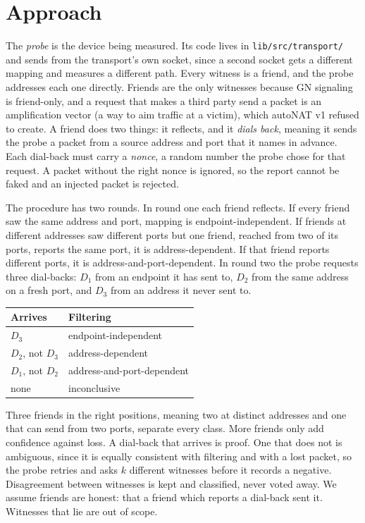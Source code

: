 \documentclass[11pt]{article}
\newcommand{\code}[1]{\texttt{\small #1}}
\begin{document}
\section{Approach}

The \emph{probe} is the device being measured. Its code lives in \code{lib/src/transport/} and sends from the transport's own socket, since a second socket gets a different mapping and measures a different path. Every witness is a friend, and the probe addresses each one directly. Friends are the only witnesses because GN signaling is friend-only, and a request that makes a third party send a packet is an amplification vector (a way to aim traffic at a victim), which autoNAT v1 refused to create. A friend does two things: it reflects, and it \emph{dials back}, meaning it sends the probe a packet from a source address and port that it names in advance. Each dial-back must carry a \emph{nonce}, a random number the probe chose for that request. A packet without the right nonce is ignored, so the report cannot be faked and an injected packet is rejected.

The procedure has two rounds. In round one each friend reflects. If every friend saw the same address and port, mapping is endpoint-independent. If friends at different addresses saw different ports but one friend, reached from two of its ports, reports the same port, it is address-dependent. If that friend reports different ports, it is address-and-port-dependent. In round two the probe requests three dial-backs: $D_1$ from an endpoint it has sent to, $D_2$ from the same address on a fresh port, and $D_3$ from an address it never sent to.

\begin{center}
\begin{tabular}{ll}
\toprule
\textbf{Arrives} & \textbf{Filtering} \\
\midrule
$D_3$ & endpoint-independent \\
$D_2$, not $D_3$ & address-dependent \\
$D_1$, not $D_2$ & address-and-port-dependent \\
none & inconclusive \\
\bottomrule
\end{tabular}
\end{center}

Three friends in the right positions, meaning two at distinct addresses and one that can send from two ports, separate every class. More friends only add confidence against loss. A dial-back that arrives is proof. One that does not is ambiguous, since it is equally consistent with filtering and with a lost packet, so the probe retries and asks $k$ different witnesses before it records a negative. Disagreement between witnesses is kept and classified, never voted away. We assume friends are honest: that a friend which reports a dial-back sent it. Witnesses that lie are out of scope.
\end{document}
